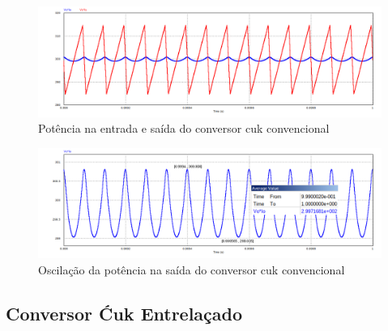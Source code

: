 \documentclass[
	12pt,				%
	openright,			%
	onseside,
	a4paper,			%
	english,			%
	french,				%
	spanish,			%
	brazil,				%
	]{abntex2}
\begin{document}
\begin{figure}[htbp]%
	\centering
		\includegraphics[width= 0.8 \linewidth]{cuk_conv_power_sign}
		\caption{Potência na entrada e saída do conversor cuk convencional}
		\label{fig:cuk_conv_power_sign}
\end{figure}
\vspace{-5pt}
\begin{figure}[htbp]%
	\centering
		\includegraphics[width=0.8 \linewidth]{cuk_conv_power_sign_out}
		\caption{Oscilação da potência na saída do conversor cuk convencional}
		\label{fig:cuk_conv_power_sign_out}
\end{figure}
\vspace{-5pt}
\subsection{Conversor Ćuk Entrelaçado}
\end{document}
